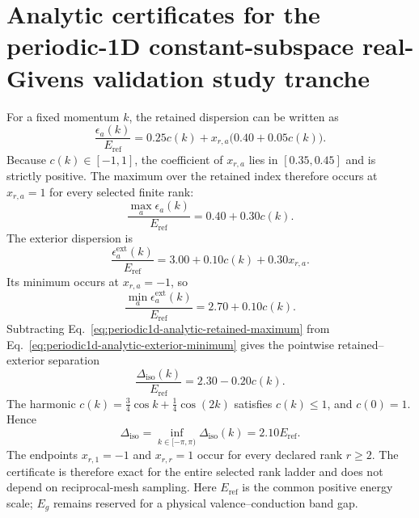\section{Analytic certificates for the periodic-1D constant-subspace real-Givens validation study tranche}
\label{app:periodic1d-analytic-gap-certificate}
For a fixed momentum $k$, the retained dispersion can be written as
\begin{equation}
 \frac{\epsilon_a(k)}{E_{\mathrm{ref}}}
 =0.25c(k)+x_{r,a}\bigl(0.40+0.05c(k)\bigr).
 \label{eq:periodic1d-analytic-retained-gap-certificate}
\end{equation}
Because $c(k)\in[-1,1]$, the coefficient of $x_{r,a}$ lies in
$[0.35,0.45]$ and is strictly positive. The maximum over the retained index therefore
occurs at $x_{r,a}=1$ for every selected finite rank:
\begin{equation}
 \frac{\max_a\epsilon_a(k)}{E_{\mathrm{ref}}}
 =0.40+0.30c(k).
 \label{eq:periodic1d-analytic-retained-maximum}
\end{equation}
The exterior dispersion is
\begin{equation}
 \frac{\epsilon_a^{\mathrm{ext}}(k)}{E_{\mathrm{ref}}}
 =3.00+0.10c(k)+0.30x_{r,a}.
\end{equation}
Its minimum occurs at $x_{r,a}=-1$, so
\begin{equation}
 \frac{\min_a\epsilon_a^{\mathrm{ext}}(k)}{E_{\mathrm{ref}}}
 =2.70+0.10c(k).
 \label{eq:periodic1d-analytic-exterior-minimum}
\end{equation}
Subtracting Eq.~\eqref{eq:periodic1d-analytic-retained-maximum} from
Eq.~\eqref{eq:periodic1d-analytic-exterior-minimum} gives the pointwise retained--exterior separation
\begin{equation}
 \frac{\Delta_{\mathrm{iso}}(k)}{E_{\mathrm{ref}}}=2.30-0.20c(k).
 \label{eq:periodic1d-analytic-pointwise-gap}
\end{equation}
The harmonic $c(k)=\tfrac34\cos k+\tfrac14\cos(2k)$ satisfies $c(k)\leq1$, and
$c(0)=1$. Hence
\begin{equation}
 \Delta_{\mathrm{iso}}
 =\inf_{k\in[-\pi,\pi)}\Delta_{\mathrm{iso}}(k)
 =2.10E_{\mathrm{ref}}.
 \label{eq:periodic1d-analytic-exact-gap}
\end{equation}
The endpoints $x_{r,1}=-1$ and $x_{r,r}=1$ occur for every declared rank $r\geq2$.
The certificate is therefore exact for the entire selected rank ladder and does not
depend on reciprocal-mesh sampling. Here $E_{\mathrm{ref}}$ is the common positive
energy scale; $E_g$ remains reserved for a physical valence--conduction band gap.

